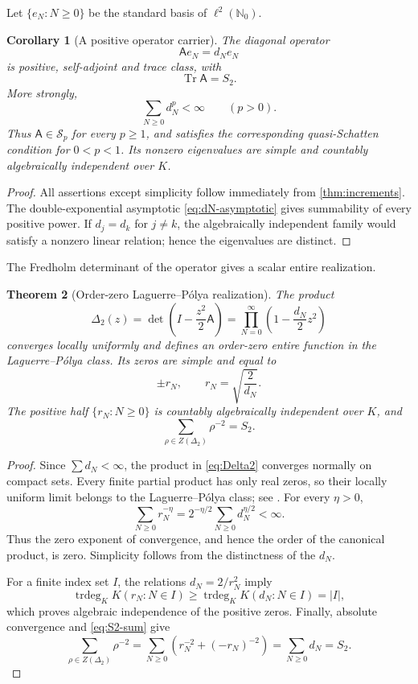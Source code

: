 \documentclass[11pt]{article}
\newtheorem{theorem}{Theorem}[section]
\newtheorem{corollary}[theorem]{Corollary}
\theoremstyle{definition}
\theoremstyle{remark}
\newcommand{\N}{\mathbb N}
\newcommand{\trdeg}{\operatorname{trdeg}}
\newcommand{\Tr}{\operatorname{Tr}}
\begin{document}
Let \(\{e_N:N\ge0\}\) be the standard basis of \(\ell^2(\N_0)\).

\begin{corollary}[A positive operator carrier]
\label{cor:operator}
The diagonal operator
\[
 \mathsf A e_N=d_Ne_N
\]
is positive, self-adjoint and trace class, with
\[
 \Tr\mathsf A=S_2.
\]
More strongly,
\[
 \sum_{N\ge0}d_N^p<\infty\qquad(p>0).
\]
Thus \(\mathsf A\in\mathcal S_p\) for every \(p\ge1\), and satisfies the
corresponding quasi-Schatten condition for \(0<p<1\).  Its nonzero
eigenvalues are simple and countably algebraically independent over \(K\).
\end{corollary}

\begin{proof}
All assertions except simplicity follow immediately from
\cref{thm:increments}.  The double-exponential asymptotic
\eqref{eq:dN-asymptotic} gives summability of every positive power.  If
\(d_j=d_k\) for \(j\ne k\), the algebraically independent family would
satisfy a nonzero linear relation; hence the eigenvalues are distinct.
\end{proof}

The Fredholm determinant of the operator gives a scalar entire realization.

\begin{theorem}[Order-zero Laguerre--P\'olya realization]
\label{thm:Delta2}
The product
\begin{equation}\label{eq:Delta2}
 \Delta_2(z)=
 \det\!\left(I-\frac{z^2}{2}\mathsf A\right)
 =\prod_{N=0}^\infty\left(1-\frac{d_N}{2}z^2\right)
\end{equation}
converges locally uniformly and defines an order-zero entire function in the
Laguerre--P\'olya class.  Its zeros are simple and equal to
\[
 \pm r_N,\qquad r_N=\sqrt{\frac2{d_N}}.
\]
The positive half \(\{r_N:N\ge0\}\) is countably algebraically independent
over \(K\), and
\begin{equation}\label{eq:Delta2-trace}
 \boxed{\displaystyle
 \sum_{\rho\in Z(\Delta_2)}\rho^{-2}=S_2.}
\end{equation}
\end{theorem}

\begin{proof}
Since \(\sum d_N<\infty\), the product in \eqref{eq:Delta2} converges
normally on compact sets.  Every finite partial product has only real zeros,
so their locally uniform limit belongs to the Laguerre--P\'olya class; see
\cite[Chapter~VIII]{Levin1996}.  For every \(\eta>0\),
\[
 \sum_{N\ge0}r_N^{-\eta}
 =2^{-\eta/2}\sum_{N\ge0}d_N^{\eta/2}<\infty.
\]
Thus the zero exponent of convergence, and hence the order of the canonical
product, is zero.  Simplicity follows from the distinctness of the \(d_N\).

For a finite index set \(I\), the relations \(d_N=2/r_N^2\) imply
\[
 \trdeg_KK(r_N:N\in I)
 \ge \trdeg_KK(d_N:N\in I)=|I|,
\]
which proves algebraic independence of the positive zeros.  Finally,
absolute convergence and \eqref{eq:S2-sum} give
\[
 \sum_{\rho\in Z(\Delta_2)}\rho^{-2}
 =\sum_{N\ge0}\left(r_N^{-2}+(-r_N)^{-2}\right)
 =\sum_{N\ge0}d_N=S_2.
\]
\end{proof}
\end{document}
